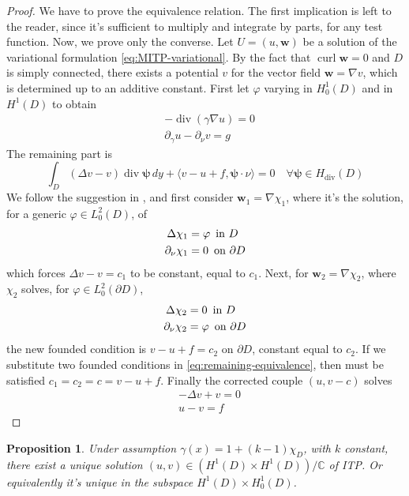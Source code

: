 \documentclass[10pt, a4paper, twoside, openright]{book}
\theoremstyle{definition}
\theoremstyle{plain}
\theoremstyle{plain}
\theoremstyle{plain}
\newtheorem{proposition}[subsection]{Proposition}
\theoremstyle{plain}
\theoremstyle{plain}
\theoremstyle{plain}
\theoremstyle{plain}
\theoremstyle{plain}
\DeclareMathOperator{\divergence}{div}
\DeclareMathOperator{\curl}{curl}
\let\phi\varphi
\begin{document}
\begin{proof}
 We have to prove the equivalence relation. The first implication is left to the reader, since it's sufficient to multiply and integrate by parts, for any test function. Now, we prove only the converse.
 Let $U=(u, \bm w)$ be a solution of the variational formulation \eqref{eq:MITP-variational}. 
 By the fact that $\curl \bm w=0$ and $D$ is simply connected, there exists a potential $v$ 
 for the vector field $\bm w = \nabla v$, which is determined up to an additive constant. 
 First let $\phi$ varying in $H^1_0(D)$ and in $H^1(D)$ to obtain
 \begin{align}
  & -\divergence(\gamma\nabla u)=0 \\
  & \partial_\gamma u - \partial_\nu v= g
 \end{align}
 The remaining part is
 \begin{equation}
 \label{eq:remaining-equivalence}
  \int_D(\Delta v - v)\divergence\bm\psi\, dy + \langle v-u + f,\bm\psi\cdot\nu\rangle = 0 \quad \forall\bm\psi\in H_{\divergence}(D)
 \end{equation}
We follow the suggestion in \cite{cakoni-colton-haddar:lsm}, and first consider $\bm w_1 = \nabla \chi_1 $, 
where it's the solution, for a generic $\phi \in L^2_0(D)$, of
\begin{align}
 \Delta \chi_1 &= \phi \, \textup{ in }D\\
 \partial_\nu \chi_1 &= 0\, \textup{ on }\partial D
\end{align}
which forces $\Delta v - v = c_1$ to be constant, equal to $c_1$. Next, for $\bm w_2 = \nabla\chi_2$, where $\chi_2$ solves, for $\phi\in L^2_0(\partial D)$,
\begin{align}
 \Delta \chi_2 &= 0 \, \textup{ in }D\\
 \partial_\nu \chi_2 &= \phi\, \textup{ on }\partial D
\end{align}
the new founded condition is $v-u+f=c_2$ on $\partial D$, constant equal to $c_2$. 
If we substitute two founded conditions in \eqref{eq:remaining-equivalence}, then must be satisfied $c_1=c_2=c=v-u+f$. Finally the corrected couple $(u,v-c)$ solves
 \begin{align}
  & - \Delta v + v=0 \\
  & u-v = f
 \end{align}
\end{proof}
\begin{proposition}
\label{prop:ITP-ex-un}
 Under assumption $\gamma(x)=1+(k-1)\chi_D$, with $k$ constant, there exist a unique solution $(u,v)\in(H^1(D) \times H^1(D))/\mathbb{C}$ of ITP. Or equivalently it's unique in the subspace $H^1(D)\times H^1_0(D)$.
\end{proposition}
\end{document}
